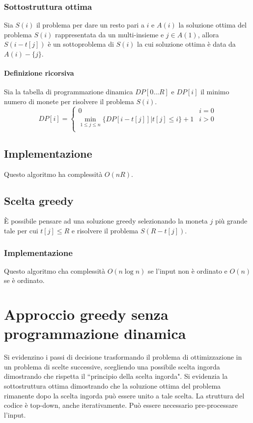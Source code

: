 	\subsubsection{Sottostruttura ottima}
	Sia $S(i)$ il problema per dare un resto pari a $i$ e $A(i)$ la soluzione ottima del problema $S(i)$ rappresentata da un multi-insieme e $j\in A(1)$, allora $S(i-t[j])$ \`e un 
	sottoproblema di $S(i)$ la cui soluzione ottima \`e data da $A(i)-\{j\}$. 
	\paragraph{Definizione ricorsiva}
	Sia la tabella di programmazione dinamica $DP[0\dots R]$ e $DP[i]$ il minimo numero di monete per risolvere il problema $S(i)$.
	$$DP[i] = \begin{cases}
		0 & i = 0 \\
		\min\limits_{1\le j\le n}\{DP[i-t[j]] | t[j]\le i\} + 1 & i>0\\
	\end{cases}$$
	\subsection{Implementazione}
	
	Questo algoritmo ha complessit\`a $O(nR)$. 
	\subsection{Scelta greedy}
	\`E possibile pensare ad una soluzione greedy selezionando la moneta $j$ pi\`u grande tale per cui $t[j]\le R$ e risolvere il problema $S(R - t[j])$. 
	\subsubsection{Implementazione}
	
	Questo algoritmo cha complessit\`a $O(n\log n)$ se l'input non \`e ordinato e $O(n)$ se \`e ordinato.
	\section{Approccio greedy senza programmazione dinamica}
	Si evidenzino i passi di decisione trasformando il problema di ottimizzazione in un problema di scelte successive, scegliendo una possibile scelta ingorda dimostrando che rispetta il
	``principio della scelta ingorda". Si evidenzia la sottostruttura ottima dimostrando che la soluzione ottima del problema rimanente dopo la scelta ingorda pu\`o essere unito a tale
	scelta. La struttura del codice \`e top-down, anche iterativamente. Pu\`o essere necessario pre-processare l'input. 
